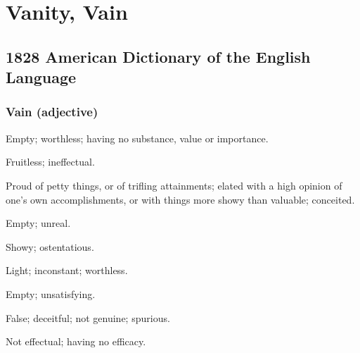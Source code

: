 \section{Vanity, Vain}
	\label{VANITY}
	

\subsection{1828 American Dictionary of the English Language} %
	\label{VANITY-1828}
	
	\subsubsection{Vain (adjective)}

		\begin{compactitem}
			\item[1] Empty; worthless; having no substance, value or importance.
			\item[2] Fruitless; ineffectual.
			\item[3] Proud of petty things, or of trifling attainments; elated with a high opinion of one's own accomplishments, or with things more showy than valuable; conceited.
			\item[4] Empty; unreal.
			\item[5] Showy; ostentatious.
			\item[6] Light; inconstant; worthless.
			\item[7] Empty; unsatisfying.
			\item[8] False; deceitful; not genuine; spurious.
			\item[9] Not effectual; having no efficacy.
		\end{compactitem}


